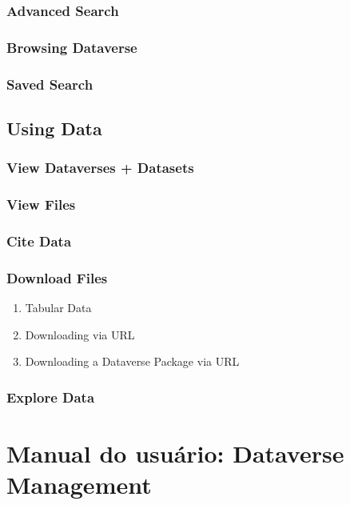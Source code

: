 \documentclass[12pt,hidelinks]{article}
\begin{document}
	    \subsubsection{Advanced Search}
	    \subsubsection{Browsing Dataverse}
	    \subsubsection{Saved Search}
	    
	\subsection{Using Data}
	
	    \subsubsection{View Dataverses + Datasets}
	    \subsubsection{View Files}
	    \subsubsection{Cite Data}
    	\subsubsection{Download Files}
    	    \begin{enumerate}[a]
	            \item Tabular Data
	            \item Downloading via URL
	            \item Downloading a Dataverse Package via URL
	        \end{enumerate}
    	\subsubsection{Explore Data}
	
\newpage



\section{Manual do usuário: Dataverse Management}
\vspace{10.5cm}
\end{document}

